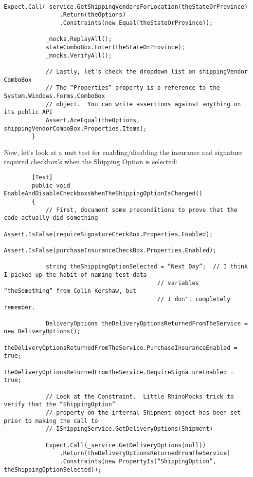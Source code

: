 \documentclass{article}
\begin{document}
{\begin{lstlisting}
            Expect.Call(_service.GetShippingVendorsForLocation(theStateOrProvince))
                .Return(theOptions)
                .Constraints(new Equal(theStateOrProvince));

            _mocks.ReplayAll();
            stateComboBox.Enter(theStateOrProvince);
            _mocks.VerifyAll(); 

            // Lastly, let's check the dropdown list on shippingVendor ComboBox
            // The “Properties” property is a reference to the System.Windows.Forms.ComboBox
            // object.  You can write assertions against anything on its public API
            Assert.AreEqual(theOptions, shippingVendorComboBox.Properties.Items);
        }
\end{lstlisting}		

Now, let's look at a unit test for enabling/disabling the insurance and signature required checkbox's when the Shipping Option is selected:

 \begin{lstlisting}
        [Test]
        public void EnableAndDisableCheckboxsWhenTheShippingOptionIsChanged()
        {
            // First, document some preconditions to prove that the code actually did something
            Assert.IsFalse(requireSignatureCheckBox.Properties.Enabled);
            Assert.IsFalse(purchaseInsuranceCheckBox.Properties.Enabled); 

            string theShippingOptionSelected = “Next Day”;  // I think I picked up the habit of naming test data
                                            // variables “theSomething” from Colin Kershaw, but
                                            // I don't completely remember.

            DeliveryOptions theDeliveryOptionsReturnedFromTheService = new DeliveryOptions();
            theDeliveryOptionsReturnedFromTheService.PurchaseInsuranceEnabled = true;
            theDeliveryOptionsReturnedFromTheService.RequireSignatureEnabled = true; 

            // Look at the Constraint.  Little RhinoMocks trick to verify that the “ShippingOption”
            // property on the internal Shipment object has been set prior to making the call to
            // IShippingService.GetDeliveryOptions(Shipment)

            Expect.Call(_service.GetDeliveryOptions(null))
                .Return(theDeliveryOptionsReturnedFromTheService)
                .Constraints(new PropertyIs(“ShippingOption”, theShippingOptionSelected)); 


\end{lstlisting}}
\end{document}
